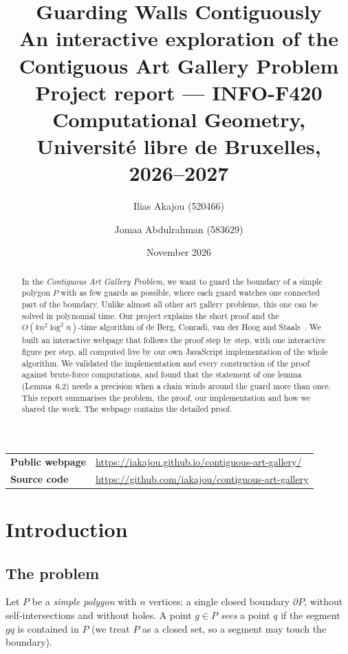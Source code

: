 \documentclass[11pt,a4paper]{article}
\title{\textbf{Guarding Walls Contiguously}\\[4pt]
\large An interactive exploration of the Contiguous Art Gallery Problem\\[2pt]
\normalsize Project report --- INFO-F420 Computational Geometry, Universit\'e libre de Bruxelles, 2026--2027}
\author{Ilias Akajou (520466) \and Jomaa Abdulrahman (583629)}
\date{November 2026}
\theoremstyle{definition}
\theoremstyle{remark}
\newcommand{\bd}{\partial P}
\begin{document}
\maketitle

\begin{center}
\begin{tabular}{@{}ll@{}}
\textbf{Public webpage} & \url{https://iakajou.github.io/contiguous-art-gallery/} \\
\textbf{Source code}    & \url{https://github.com/iakajou/contiguous-art-gallery} \\
\end{tabular}
\end{center}

\begin{abstract}
In the \emph{Contiguous Art Gallery Problem}, we want to guard the boundary of a simple polygon $P$ with as few guards as possible, where each guard
watches one connected part of the boundary. Unlike almost all other art gallery problems, this one can be solved in polynomial time. Our project explains
the short proof and the $O(kn^2\log^2 n)$-time algorithm of de Berg, Conradi, van der Hoog and Staals~\cite{deBerg2025}. We built an interactive webpage that
follows the proof step by step, with one interactive figure per step, all computed live by our own JavaScript implementation of the whole algorithm.
We validated the implementation and every construction of the proof against brute-force computations, and found that the statement of one lemma
(Lemma~6.2) needs a precision when a chain winds around the guard more than once. This report summarises the problem, the proof, our implementation
and how we shared the work. The webpage contains the detailed proof.
\end{abstract}

\tableofcontents

\section{Introduction}

\subsection{The problem}

Let $P$ be a \emph{simple polygon} with $n$ vertices: a single closed boundary $\bd$, without self-intersections and without holes. A point $g\in P$
\emph{sees} a point $q$ if the segment $gq$ is contained in $P$ (we treat $P$ as a closed set, so a segment may touch the boundary).
\end{document}

